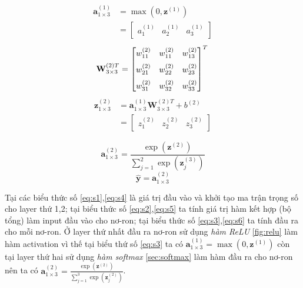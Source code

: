 \begin{equation}
\label{eq:s3}
\begin{split}
\textbf{a}^{(1)}_{1 \times 3}	&	=\max(0,\textbf{z}^{(1)})\\
	&	 = \begin{bmatrix}
	a^{(1)}_1 &a^{(1)}_2 &a^{(1)}_3 
	\end{bmatrix}
\end{split}
\end{equation}
\begin{equation}
\label{eq:s4}
\textbf{W}^{(2)T}_{3{\times}3} = \begin{bmatrix}
	w^{(2)}_{11} &w^{(2)}_{11} & w^{(2)}_{13}\\[6pt]
	w^{(2)}_{21} &w^{(2)}_{22} & w^{(2)}_{23}\\[6pt]
	w^{(2)}_{31} &w^{(2)}_{32} & w^{(2)}_{33}
\end{bmatrix}^T\\
\end{equation}
\begin{equation}
\label{eq:s5}
\begin{split}
\textbf{z}^{(2)}_{1\times 3}	&	=\textbf{a}^{(1)}_{1 \times 3}\textbf{W}^{(2)T}_{3{{\times}}3}+b^{(2)}\\
&	 = \begin{bmatrix}
z^{(2)}_{1} &z^{(2)}_{2} &z^{(2)}_{3} 
\end{bmatrix}
\end{split}
\end{equation}

\begin{equation}
\label{eq:s6}
\textbf{a}^{(2)}_{1\times 3} = \frac{\exp({\textbf{z}^{(2)}})}{\sum^{2}_{j=1}{\exp({\textbf{z}^{(3)}_j})}}
\end{equation}
\begin{equation*}
\widehat{\textbf{y}}=\textbf{a}^{(2)}_{1\times 3}
\end{equation*}

Tại các biểu thức số \ref{eq:s1},\ref{eq:s4} là giá trị đầu vào và khởi tạo ma trận trọng số cho layer thứ 1,2; tại biểu thức số \ref{eq:s2},\ref{eq:s5} ta tính giá trị hàm kết hợp (bộ tổng) làm input đầu vào cho nơ-ron; tại biểu thức số \ref{eq:s3},\ref{eq:s6} ta tính đầu ra cho mỗi nơ-ron. Ở layer thứ nhất đầu ra nơ-ron sử dụng \textit{hàm ReLU} \ref{fig:relu} làm hàm activation vì thế tại biểu thứ số \ref{eq:s3} ta có  $\textbf{a}^{(1)}_{1 \times 3}	=\max(0,\textbf{z}^{(1)})$ còn tại layer thứ hai sử dụng \textit{hàm softmax} \ref{sec:softmax} làm hàm đầu ra cho nơ-ron nên ta có $\textbf{a}^{(2)}_{1\times 3} = \frac{\exp({\textbf{z}^{(2)}})}{\sum^{3}_{j=1}{\exp({\textbf{z}^{(2)}_j})}}$.


